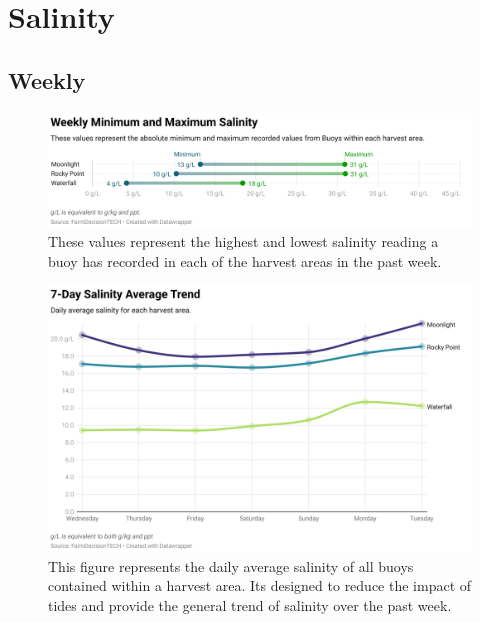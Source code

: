 \documentclass[10pt]{article}
\begin{document}
\pagebreak

\tableofcontents

\listoffigures

\pagebreak

\section{Salinity}
\subsection{Weekly}

\begin{figure}[H]
\centering
\includegraphics[width=\textwidth]{weekly-salinity-extremes.png}
\caption[Weekly Minimum and Maximum Salinity]{These values represent the highest and lowest salinity reading a buoy has recorded in each of the harvest areas in the past week.}
\end{figure}

\begin{figure}[H]
\centering
\includegraphics[width=\textwidth]{weekly-salinity-chart.png}
\caption[Average Weekly Salinity Chart]{This figure represents the daily average salinity of all buoys contained within a harvest area. Its designed to reduce the impact of tides and provide the general trend of salinity over the past week.}
\end{figure}
\end{document}
